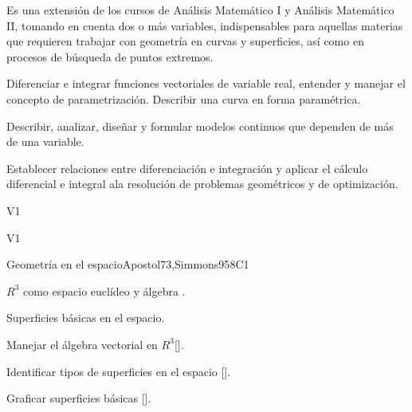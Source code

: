 \begin{syllabus}


\begin{justification}
Es una extensión de los cursos de Análisis Matemático I y Análisis Matemático II, tomando en cuenta dos o más variables, indispensables para aquellas materias que requieren trabajar con geometría en curvas y superficies, así como en procesos de búsqueda de puntos extremos.
\end{justification}

\begin{goals}
\item Diferenciar e integrar funciones vectoriales de variable real, entender y manejar el concepto de parametrización. Describir una curva en forma paramétrica.
\item Describir, analizar, diseñar y formular modelos continuos que dependen de más de una variable.
\item Establecer relaciones entre diferenciación e integración y aplicar el cálculo diferencial e integral ala resolución de problemas geométricos y de optimización.
\end{goals}

\begin{outcomes}{V1}
    \item {}
    \item {}
\end{outcomes}

\begin{competences}{V1}
    \item {} 
    \item {} 
    \item {}
\end{competences}

\begin{unit}{}{Geometría en el espacio}{Apostol73,Simmons95}{8}{C1}
   \begin{topics}
      \item $R^3$ como espacio euclídeo y álgebra .
      \item Superficies básicas en el espacio.
   \end{topics}
   \begin{learningoutcomes}
      \item Manejar el álgebra vectorial en $R^3$[\Usage].
      \item Identificar tipos de superficies en el espacio [\Usage].
      \item Graficar superficies básicas [\Usage].
      \end{learningoutcomes}
\end{unit}


\end{syllabus}
